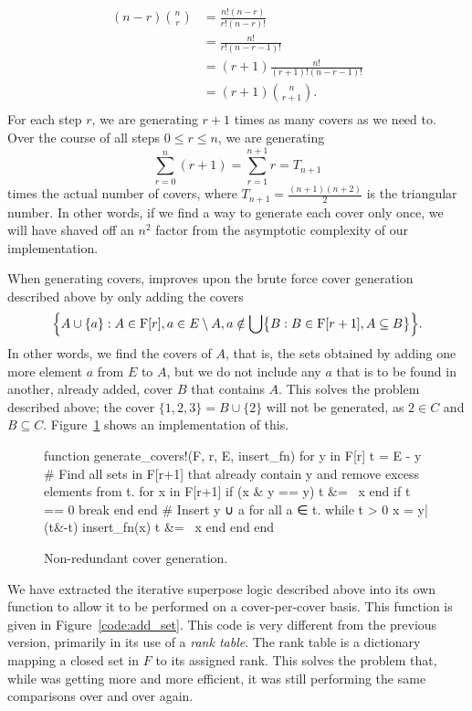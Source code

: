 $$\begin{aligned}
  (n-r)\binom{n}{r} &= \frac{n!(n-r)}{r!(n-r)!} \\
                    &= \frac{n!}{r!(n-r-1)!} \\
                    &= (r+1)\frac{n!}{(r+1)!(n-r-1)!} \\
                    &= (r+1)\binom{n}{r+1}. \\
\end{aligned}$$
For each step $r$, we are generating $r+1$ times as many covers as we need to. Over the course of all steps $0\leq r\leq n$, we are generating $$\sum_{r=0}^n (r+1) = \sum_{r=1}^{n+1}r = T_{n+1}$$ times the actual number of covers, where $T_{n+1}=\frac{(n+1)(n+2)}{2}$ is the triangular number. In other words, if we find a way to generate each cover only once, we will have shaved off an $n^2$ factor from the asymptotic complexity of our implementation.

When generating covers,  improves upon the brute force cover generation described above by only adding the covers 
$$\Bigl\{ A \cup \{ a \} : A \in \mathrm{F}[r], a \in E \setminus A, a \notin \bigcup \bigl\{ B : B \in \mathrm{F}[r+1], A \subseteq B \bigr\} \Bigr\}.$$
In other words, we find the covers of $A$, that is, the sets obtained by adding one more element $a$ from $E$ to $A$, but we do not include any $a$ that is to be found in another, already added, cover $B$ that contains $A$. This solves the problem described above; the cover $\{1,2,3\} = B \cup \{ 2 \}$ will not be generated, as $2 \in C$ and $B \subseteq C$. Figure~\ref{code:smart_covers} shows an implementation of this.

\begin{figure}
\begin{jllisting}
function generate_covers!(F, r, E, insert_fn)
  for y in F[r]
    t = E - y
    # Find all sets in F[r+1] that already contain y and remove excess elements from t.
    for x in F[r+1]
      if (x & y == y) t &= ~x end
      if t == 0 break end
    end
    # Insert y ∪ a for all a ∈ t.
    while t > 0
      x = y|(t&-t)
      insert_fn(x)
      t &= ~x
    end
  end
end
\end{jllisting}
\caption{Non-redundant cover generation.}
\label{code:smart_covers}
\end{figure}

We have extracted the iterative superpose logic described above into its own function  to allow it to be performed on a cover-per-cover basis. This function is given in Figure~\ref{code:add_set}. This code is very different from the previous version, primarily in its use of a \textit{rank table}. The rank table is a dictionary mapping a closed set in $F$ to its assigned rank. This solves the problem that, while  was getting more and more efficient, it was still performing the same comparisons over and over again.

